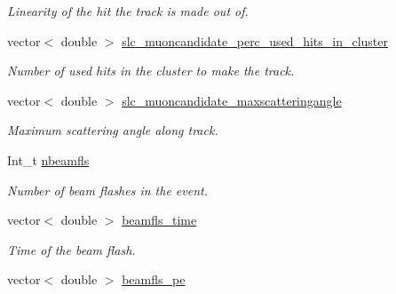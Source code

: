 \begin{DoxyCompactItemize}
\begin{DoxyCompactList}\small\item\em Linearity of the hit the track is made out of. \end{DoxyCompactList}\item 
\hypertarget{classUBXSecEvent_a946ace636527632fed09f2d9e075e87e}{vector$<$ double $>$ \hyperlink{classUBXSecEvent_a946ace636527632fed09f2d9e075e87e}{slc\-\_\-muoncandidate\-\_\-perc\-\_\-used\-\_\-hits\-\_\-in\-\_\-cluster}}\label{classUBXSecEvent_a946ace636527632fed09f2d9e075e87e}

\begin{DoxyCompactList}\small\item\em Number of used hits in the cluster to make the track. \end{DoxyCompactList}\item 
\hypertarget{classUBXSecEvent_ad1f8e0086022ff8db9be1bbe8860c6d1}{vector$<$ double $>$ \hyperlink{classUBXSecEvent_ad1f8e0086022ff8db9be1bbe8860c6d1}{slc\-\_\-muoncandidate\-\_\-maxscatteringangle}}\label{classUBXSecEvent_ad1f8e0086022ff8db9be1bbe8860c6d1}

\begin{DoxyCompactList}\small\item\em Maximum scattering angle along track. \end{DoxyCompactList}\item 
\hypertarget{classUBXSecEvent_a2bf72740213db9d50d45c603eb3c549e}{Int\-\_\-t \hyperlink{classUBXSecEvent_a2bf72740213db9d50d45c603eb3c549e}{nbeamfls}}\label{classUBXSecEvent_a2bf72740213db9d50d45c603eb3c549e}

\begin{DoxyCompactList}\small\item\em Number of beam flashes in the event. \end{DoxyCompactList}\item 
\hypertarget{classUBXSecEvent_aff5ca08ec3a193029979e23b73d49d85}{vector$<$ double $>$ \hyperlink{classUBXSecEvent_aff5ca08ec3a193029979e23b73d49d85}{beamfls\-\_\-time}}\label{classUBXSecEvent_aff5ca08ec3a193029979e23b73d49d85}

\begin{DoxyCompactList}\small\item\em Time of the beam flash. \end{DoxyCompactList}\item 
\hypertarget{classUBXSecEvent_a3d703c077ccb0b00cacd04c6e751a2eb}{vector$<$ double $>$ \hyperlink{classUBXSecEvent_a3d703c077ccb0b00cacd04c6e751a2eb}{beamfls\-\_\-pe}}\label{classUBXSecEvent_a3d703c077ccb0b00cacd04c6e751a2eb}


\end{DoxyCompactItemize}
